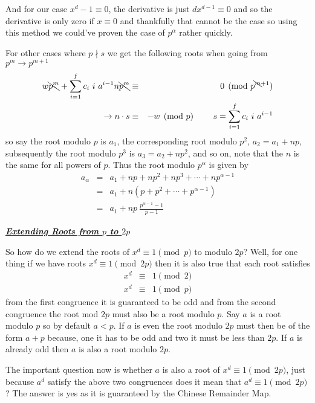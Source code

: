 \documentclass[aps,preprint,preprintnumbers,nofootinbib,showpacs,prd]{revtex4-1}
\newcommand{\nbea}{\begin{eqnarray*}}
\newcommand{\neea}{\end{eqnarray*}}
\begin{document}
And for our case $x^d - 1 \equiv 0$, the derivative is just $d x^{d-1} \equiv 0$ and so the derivative is only zero if $x \equiv 0$ and thankfully that cannot be the case so using this method we could've proven the case of $p^\alpha$ rather quickly.

For other cases where $p\nmid s$ we get the following roots when going from $p^m \to p^{m+1}$
%
\nbea
w\bcancel{p^m} + \sum_{i = 1}^f c_i~ i~ a^{i-1}n\bcancel{p^m} & \equiv & 0 \pmod{p^{\bcancel{m}+1}} \\
\to n \cdot s & \equiv & -w \pmod{p} ~~~~~~~ s = \sum_{i = 1}^f c_i~ i~ a^{i-1}
\neea
%
so say the root modulo $p$ is $a_1$, the corresponding root modulo $p^2$, $a_2 = a_1 + np$, subsequently the root modulo $p^3$ is $a_3 = a_2 + np^2$, and so on, note that the $n$ is the same for all powers of $p$. Thus the root modulo $p^\alpha$ is given by
%
\nbea
a_\alpha & = & a_1 + np + np^2 + np^3 + \cdots + np^{\alpha-1} \\
& = & a_1 + n(p + p^2 + \cdots + p^{\alpha-1}) \\
& = & a_1 + np ~ \frac{p^{\alpha-1} - 1}{p-1}
\neea
%

\bigskip
\underline{\textit{\textbf{Extending Roots from $p$ to $2p$}}}
\bigskip

So how do we extend the roots of $x^d \equiv 1 \pmod{p}$ to modulo $2p$? Well, for one thing if we have roots $x^d \equiv 1 \pmod{2p}$ then it is also true that each root satisfies
%
\nbea
x^d & \equiv & 1 \pmod{2} \\
x^d & \equiv & 1 \pmod{p}
\neea
%
from the first congruence it is guaranteed to be odd and from the second congruence the root mod $2p$ must also be a root modulo $p$. Say $a$ is a root modulo $p$ so by default $a < p$. If $a$ is even the root modulo $2p$ must then be of the form $a + p$ because, one it has to be odd and two it must be less than $2p$. If $a$ is already odd then $a$ is also a root modulo $2p$. 

The important question now is whether $a$ is also a root of $x^d \equiv 1 \pmod{2p}$, just because $a^d$ satisfy the above two congruences does it mean that $a^d \equiv 1 \pmod{2p}$? The answer is yes as it is guaranteed by the Chinese Remainder Map.
\end{document}
